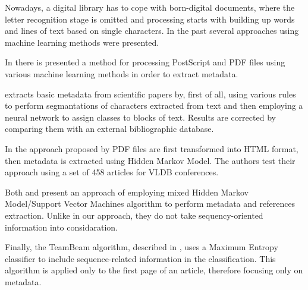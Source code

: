Nowadays, a digital library has to cope with born-digital documents, where the letter recognition stage is omitted and processing starts with building up words and lines of text based on single characters. In the past several approaches using machine learning methods were presented.

In \cite{Esposito2008} there is presented a method for processing PostScript and PDF files using various machine learning methods in order to extract metadata.

\cite{Marinai2009} extracts basic metadata from scientific papers by, first of all, using various rules to perform segmantations of characters extracted from text and then employing a neural network to assign classes to blocks of text. Results are corrected by comparing them with an external bibliographic database.

In the approach proposed by \cite{Chen.2010} PDF files are first transformed into HTML format, then metadata is extracted using Hidden Markov Model. The authors test their approach using a set of 458 articles for VLDB conferences.

Both \cite{HuiHan} and \cite{HuiHan2005} present an approach of employing mixed Hidden Markov Model/Support Vector Machines algorithm to perform metadata and references extraction. Unlike in our approach, they do not take sequency-oriented information into considaration.

Finally, the TeamBeam algorithm, described in \cite{Kern2012}, uses a Maximum Entropy classifier to include sequence-related information in the classification. This algorithm is applied only to the first page of an article, therefore focusing only on metadata.

